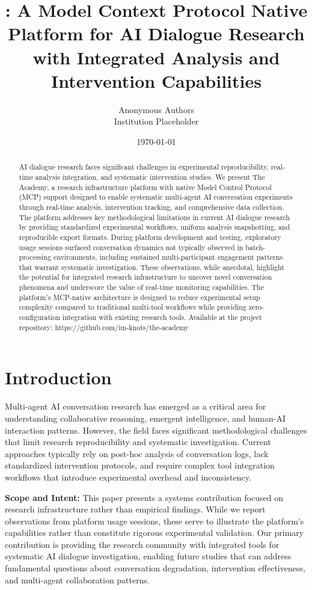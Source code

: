 \documentclass[11pt,letterpaper]{article}
\title{\theacademy{}: A Model Context Protocol Native Platform for AI Dialogue Research with Integrated Analysis and Intervention Capabilities}
\author{
Anonymous Authors \\
Institution Placeholder
}
\date{\today}
\newcommand{\theacademy}{The Academy}
\newcommand{\mcp}{MCP}
\begin{document}
\maketitle

\begin{abstract}
AI dialogue research faces significant challenges in experimental reproducibility, real-time analysis integration, and systematic intervention studies. We present \theacademy{}, a research infrastructure platform with native Model Control Protocol (\mcp{}) support designed to enable systematic multi-agent AI conversation experiments through real-time analysis, intervention tracking, and comprehensive data collection. The platform addresses key methodological limitations in current AI dialogue research by providing standardized experimental workflows, uniform analysis snapshotting, and reproducible export formats. During platform development and testing, exploratory usage sessions surfaced conversation dynamics not typically observed in batch-processing environments, including sustained multi-participant engagement patterns that warrant systematic investigation. These observations, while anecdotal, highlight the potential for integrated research infrastructure to uncover novel conversation phenomena and underscore the value of real-time monitoring capabilities. The platform's \mcp{}-native architecture is designed to reduce experimental setup complexity compared to traditional multi-tool workflows while providing zero-configuration integration with existing research tools.
Available at the project repository: https://github.com/im-knots/the-academy
\end{abstract}

\section{Introduction}

Multi-agent AI conversation research has emerged as a critical area for understanding collaborative reasoning, emergent intelligence, and human-AI interaction patterns. However, the field faces significant methodological challenges that limit research reproducibility and systematic investigation. Current approaches typically rely on post-hoc analysis of conversation logs, lack standardized intervention protocols, and require complex tool integration workflows that introduce experimental overhead and inconsistency.

\textbf{Scope and Intent:} This paper presents a systems contribution focused on research infrastructure rather than empirical findings. While we report observations from platform usage sessions, these serve to illustrate the platform's capabilities rather than constitute rigorous experimental validation. Our primary contribution is providing the research community with integrated tools for systematic AI dialogue investigation, enabling future studies that can address fundamental questions about conversation degradation, intervention effectiveness, and multi-agent collaboration patterns.
\end{document}
